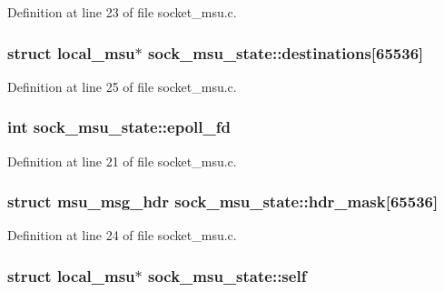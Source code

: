 Definition at line 23 of file socket\-\_\-msu.\-c.

\hypertarget{structsock__msu__state_a316dd9a4f75911daa33496088766b3da}{
\subsubsection[{destinations}]{\setlength{\rightskip}{0pt plus 5cm}struct {\bf local\-\_\-msu}$\ast$ sock\-\_\-msu\-\_\-state\-::destinations\mbox{[}65536\mbox{]}}}\label{structsock__msu__state_a316dd9a4f75911daa33496088766b3da}


Definition at line 25 of file socket\-\_\-msu.\-c.

\hypertarget{structsock__msu__state_ad759ccb29fb3de7b6dda139dbde0e825}{
\subsubsection[{epoll\-\_\-fd}]{\setlength{\rightskip}{0pt plus 5cm}int sock\-\_\-msu\-\_\-state\-::epoll\-\_\-fd}}\label{structsock__msu__state_ad759ccb29fb3de7b6dda139dbde0e825}


Definition at line 21 of file socket\-\_\-msu.\-c.

\hypertarget{structsock__msu__state_ab195dc5130a98fdf868543dc6e153fcb}{
\subsubsection[{hdr\-\_\-mask}]{\setlength{\rightskip}{0pt plus 5cm}struct {\bf msu\-\_\-msg\-\_\-hdr} sock\-\_\-msu\-\_\-state\-::hdr\-\_\-mask\mbox{[}65536\mbox{]}}}\label{structsock__msu__state_ab195dc5130a98fdf868543dc6e153fcb}


Definition at line 24 of file socket\-\_\-msu.\-c.

\hypertarget{structsock__msu__state_a041ff140d8b0451b98418ea68dc4f62c}{
\subsubsection[{self}]{\setlength{\rightskip}{0pt plus 5cm}struct {\bf local\-\_\-msu}$\ast$ sock\-\_\-msu\-\_\-state\-::self}}\label{structsock__msu__state_a041ff140d8b0451b98418ea68dc4f62c}


